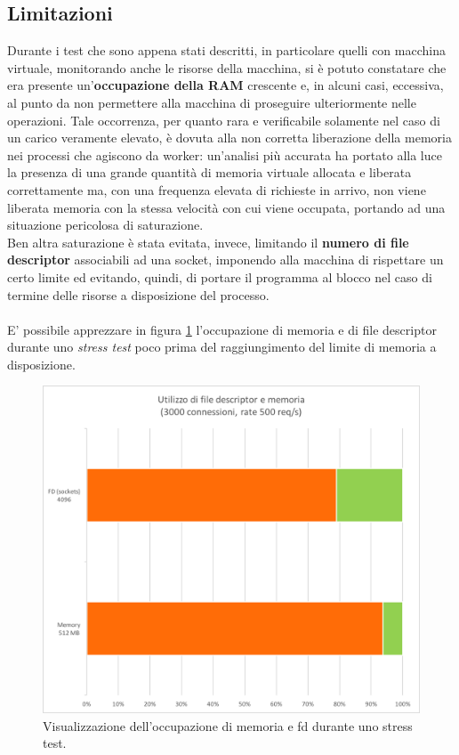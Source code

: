 \documentclass[italian]{tktltiki2}
\begin{document}
\subsection{Limitazioni}
Durante i test che sono appena stati descritti, in particolare quelli con macchina virtuale, monitorando anche le risorse della macchina, si è potuto constatare che era presente un'\textbf{occupazione della RAM} crescente e, in alcuni casi, eccessiva, al punto da non permettere alla macchina di proseguire ulteriormente nelle operazioni. Tale occorrenza, per quanto rara e verificabile solamente nel caso di un carico veramente elevato, è dovuta alla non corretta liberazione della memoria nei processi che agiscono da worker: un'analisi più accurata ha portato alla luce la presenza di una grande quantità di memoria virtuale allocata e liberata correttamente ma, con una frequenza elevata di richieste in arrivo, non viene liberata memoria con la stessa velocità con cui viene occupata, portando ad una situazione pericolosa di saturazione. \\
Ben altra saturazione è stata evitata, invece, limitando il \textbf{numero di file descriptor} associabili ad una socket, imponendo alla macchina di rispettare un certo limite ed evitando, quindi, di portare il programma al blocco nel caso di termine delle risorse a disposizione del processo. \\\\
E' possibile apprezzare in figura \ref{fig: fd_memory} l'occupazione di memoria e di file descriptor durante uno \emph{stress test} poco prima del raggiungimento del limite di memoria a disposizione. 
\begin{figure}[H]
\centering
\includegraphics[width=\textwidth]{images/fd_memory}
\caption{Visualizzazione dell'occupazione di memoria e fd durante uno stress test.\label{fig: fd_memory}}
\end{figure}
\end{document}
